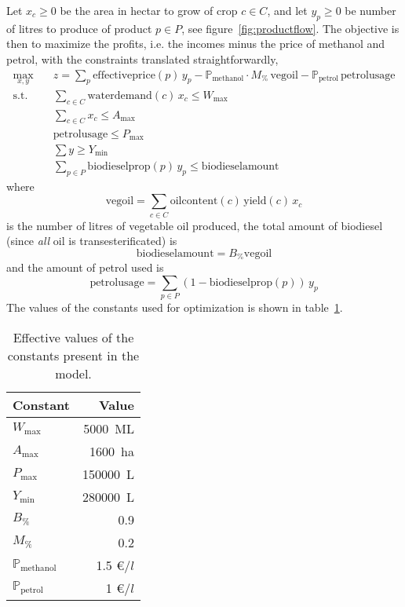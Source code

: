 \documentclass{article}
\begin{document}
Let $x_c \ge 0$ be the area in hectar to grow of crop $c \in C$,
and let $y_p \ge 0$ be number of litres to produce of product $p \in P$,
see figure~\ref{fig:productflow}.
The objective is then to maximize the profits,
i.e. the incomes minus the price of methanol and petrol,
with the constraints translated straightforwardly,
\begin{equation*}
	\begin{aligned}
		\max_{x, y} \quad & z = \sum_p \text{effectiveprice}(p) \, y_p - \mathbb P_\text{methanol} \cdot M_\% \, \text{vegoil} - \mathbb P_\text{petrol} \, \text{petrolusage} \\
		\textrm{s.t.} \quad & \sum_{c \in C} \text{waterdemand}(c) \, x_c \le W_\text{max} \\
		& \sum_{c \in C} x_c \le A_\text{max} \\
		& \text{petrolusage} \le P_\text{max} \\
		& \sum y \ge Y_\text{min} \\
		& \sum_{p \in P} \text{biodieselprop}(p) \, y_p \le \text{biodieselamount}
	\end{aligned}
\end{equation*}
where
$$ \text{vegoil} = \sum_{c \in C} \text{oilcontent}(c) \, \text{yield}(c) \, x_c $$
is the number of litres of vegetable oil produced,
the total amount of biodiesel (since \emph{all} oil is transesterificated) is
$$ \text{biodieselamount} = B_\% \text{vegoil} $$
and the amount of petrol used is
$$ \text{petrolusage} = \sum_{p \in P} (1 - \text{biodieselprop}(p)) \, y_p $$
The values of the constants used for optimization is shown in table~\ref{tab:const_vals}.

\begin{table}
	\centering
	\caption{Effective values of the constants present in the model. \label{tab:const_vals}}
	\begin{tabular}{l r}
		\toprule
		Constant & Value \\
		\midrule
		$W_\text{max}$ & \SI{5000}{\mega\liter} \\
		$A_\text{max}$ & \SI{1600}{\hectare} \\
		$P_\text{max}$ & \SI{150000}{\liter} \\
		$Y_\text{min}$ & \SI{280000}{\liter} \\
		$B_\%$ & 0.9 \\
		$M_\%$ & 0.2 \\
		$\mathbb P_\text{methanol}$ & 1.5 \euro/$l$ \\
		$\mathbb P_\text{petrol}$ & 1 \euro/$l$ \\
		\bottomrule
	\end{tabular}
\end{table}
\end{document}
